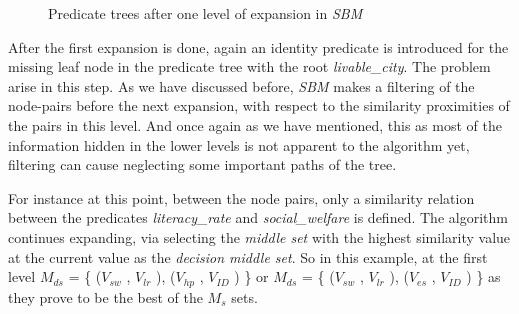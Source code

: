 \begin{figure}[h!]
\begin{center}
\end{center}
\caption{Predicate trees after one level of expansion in \textit{SBM}}
\label{fig:res1}
\end{figure}

After the first expansion is done, again an identity predicate is introduced for the missing leaf node in the predicate tree with the root \textit{livable\_city}. The problem arise in this step. As we have discussed before, \textit{SBM} makes a filtering of the node-pairs before the next expansion, with respect to the similarity proximities of the pairs in this level. And once again as we have mentioned, this as most of the information hidden in the lower levels is not apparent to the algorithm yet, filtering can cause neglecting some important paths of the tree.

For instance at this point, between the node pairs, only a similarity relation between the predicates \textit{literacy\_rate} and \textit{social\_welfare} is defined. The algorithm continues expanding, via selecting the \textit{middle set} with the highest similarity value at the current value as the \textit{decision middle set}. So in this example, at the first level \textit{$M_{ds}$} = \{ (\textit{$V_{sw }$} , \textit{$V_{lr}$} ), (\textit{$V_{hp }$} , \textit{$V_{ID}$} ) \}  or \textit{$M_{ds}$} = \{ (\textit{$V_{sw }$} , \textit{$V_{lr}$} ), (\textit{$V_{es }$} , \textit{$V_{ID}$} ) \}  as they prove to be the best of the \textit{$M_{s}$} sets.



